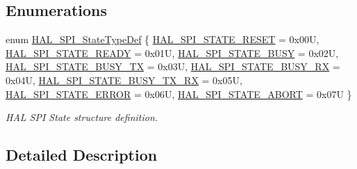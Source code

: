 \subsection*{Enumerations}
\begin{DoxyCompactItemize}
\item 
enum \mbox{\hyperlink{group___s_p_i___exported___types_ga8891cb64e76198a860172d94c638c9b4}{H\+A\+L\+\_\+\+S\+P\+I\+\_\+\+State\+Type\+Def}} \{ \newline
\mbox{\hyperlink{group___s_p_i___exported___types_gga8891cb64e76198a860172d94c638c9b4adbc218df2c9841b561282b40b3ded69d}{H\+A\+L\+\_\+\+S\+P\+I\+\_\+\+S\+T\+A\+T\+E\+\_\+\+R\+E\+S\+ET}} = 0x00U, 
\mbox{\hyperlink{group___s_p_i___exported___types_gga8891cb64e76198a860172d94c638c9b4abb3992c67a15c14bd1808ef6b63fa926}{H\+A\+L\+\_\+\+S\+P\+I\+\_\+\+S\+T\+A\+T\+E\+\_\+\+R\+E\+A\+DY}} = 0x01U, 
\mbox{\hyperlink{group___s_p_i___exported___types_gga8891cb64e76198a860172d94c638c9b4a0635e168bc0430253fe8e74cfe9768fd}{H\+A\+L\+\_\+\+S\+P\+I\+\_\+\+S\+T\+A\+T\+E\+\_\+\+B\+U\+SY}} = 0x02U, 
\mbox{\hyperlink{group___s_p_i___exported___types_gga8891cb64e76198a860172d94c638c9b4a5d82b644c7ca656ab5fe8a8e3cbc29ab}{H\+A\+L\+\_\+\+S\+P\+I\+\_\+\+S\+T\+A\+T\+E\+\_\+\+B\+U\+S\+Y\+\_\+\+TX}} = 0x03U, 
\newline
\mbox{\hyperlink{group___s_p_i___exported___types_gga8891cb64e76198a860172d94c638c9b4afd7e00128aca1feaa099c2595ffb9277}{H\+A\+L\+\_\+\+S\+P\+I\+\_\+\+S\+T\+A\+T\+E\+\_\+\+B\+U\+S\+Y\+\_\+\+RX}} = 0x04U, 
\mbox{\hyperlink{group___s_p_i___exported___types_gga8891cb64e76198a860172d94c638c9b4a9dae2883ae3e43ca28afc9453a14c938}{H\+A\+L\+\_\+\+S\+P\+I\+\_\+\+S\+T\+A\+T\+E\+\_\+\+B\+U\+S\+Y\+\_\+\+T\+X\+\_\+\+RX}} = 0x05U, 
\mbox{\hyperlink{group___s_p_i___exported___types_gga8891cb64e76198a860172d94c638c9b4a3cba266d2346abe3b62fa0acccab4711}{H\+A\+L\+\_\+\+S\+P\+I\+\_\+\+S\+T\+A\+T\+E\+\_\+\+E\+R\+R\+OR}} = 0x06U, 
\mbox{\hyperlink{group___s_p_i___exported___types_gga8891cb64e76198a860172d94c638c9b4a34f9231d040d752a034db85e3eb7f782}{H\+A\+L\+\_\+\+S\+P\+I\+\_\+\+S\+T\+A\+T\+E\+\_\+\+A\+B\+O\+RT}} = 0x07U
 \}
\begin{DoxyCompactList}\small\item\em H\+AL S\+PI State structure definition. \end{DoxyCompactList}\end{DoxyCompactItemize}


\subsection{Detailed Description}


